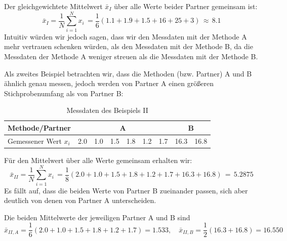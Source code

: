 Der gleichgewichtete Mittelwert $\bar x_I$ über alle Werte beider Partner gemeinsam ist:
 \begin{equation}
 \bar x_I = \frac{1}{N} \sum_{i=1}^N x_i \, = \frac{1}{6}\left( 1.1 + 1.9 + 1.5 + 16 + 25 + 3 \right) \, \approx \, 8.1
 \end{equation}
 Intuitiv würden wir jedoch sagen, dass wir den Messdaten mit der Methode A
 mehr vertrauen schenken würden, als den Messdaten mit der Methode B, da die 
 Messdaten der Methode A weniger streuen als die Messdaten mit der Methode B.

 Als zweites Beispiel betrachten wir, dass die Methoden (bzw. Partner) A und B ähnlich
 genau messen, jedoch werden von Partner A einen größeren Stichprobenumfang
 als von Partner B:

 
 \begin{table}[!htb]
 	\caption{Messdaten des Beispiels II}
 	\begin{center}
 		\begin{tabular}{l| rrrrrr |rr}
 			\hline 
 			Methode/Partner & \multicolumn{6}{c}{A} \vline & \multicolumn{2}{c}{B} \\ \hline
 			Gemessener Wert $x_i$ & 2.0 & 1.0 & 1.5 & 1.8 & 1.2 & 1.7 
 			& 16.3 & 16.8\\ \hline
 		\end{tabular}
 	\end{center}
 	\label{tab:Beispiel_II}
 \end{table}
Für den Mittelwert über alle Werte gemeinsam erhalten wir:
 \begin{equation}
 \bar x_{II} = \frac{1}{N} \sum_{i=1}^N x_i \, = \frac{1}{8}\left( 2.0 + 1.0 + 1.5 + 1.8 + 1.2 + 1.7 + 16.3 + 16.8 \right) \, = \, 5.2875
\label{eq:einfachesMittelII}
 \end{equation}
Es fällt auf, dass die beiden Werte von Partner B zueinander passen, sich aber deutlich von denen von Partner A unterscheiden.

Die beiden Mittelwerte der jeweiligen Partner A und B sind
 \begin{equation}
 \bar x_{II,A} = \frac{1}{6}\left( 2.0 + 1.0 + 1.5 + 1.8 + 1.2 + 1.7 \right) = 1.533, 
\quad \bar x_{II,B} = \frac{1}{2}\left( 16.3 + 16.8 \right) = 16.550
 \label{eq:Mittelwerte_x_II_A_B}
 \end{equation}

